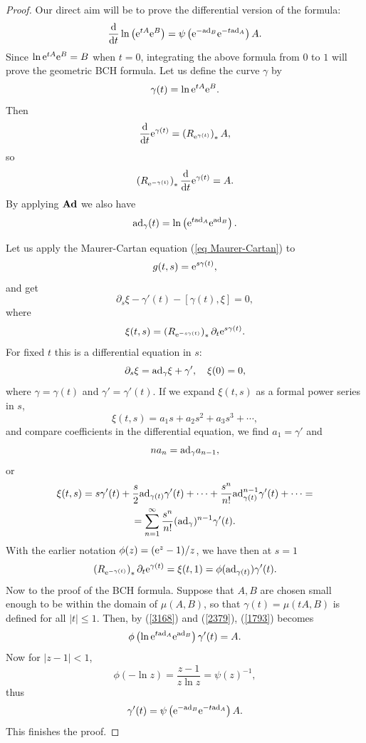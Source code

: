\begin{proof}
    Our direct aim will be to prove the differential version of the formula:
    \[\frac{{\mathrm{d}}}{{\mathrm{d}} t}\ln\left(\mathrm{e}^{tA} \mathrm{e}^B\right)=\psi\left(\mathrm{e}^{-\mathrm{ad}_B}\mathrm{e}^{-t\mathrm{ad}_A}\right)A.\]
    Since $\ln \mathrm{e}^{tA} \mathrm{e}^{B}=B$ when $t=0$, integrating the above formula from $0$ to $1$ will prove the geometric BCH formula. Let us define the curve $\gamma$ by
    \[\gamma(t)=\ln \mathrm{e}^{tA} \mathrm{e}^{B}.\]
    Then
    \[\frac{{\mathrm{d}}}{{\mathrm{d}} t} \mathrm{e}^{\gamma(t)}=\left(R_{\mathrm{e}^{\gamma(t)}}\right)_\ast A,\]
    so
    \[\left(R_{\mathrm{e}^{-\gamma(t)}}\right)_\ast\frac{{\mathrm{d}}}{{\mathrm{d}} t}\mathrm{e}^{\gamma(t)}=A.\label{2379}\]
    By applying $\mathrm{\mathbf{Ad}}$ we also have
    \[\mathrm{ad}_\gamma(t)=\ln\left(\mathrm{e}^{t\mathrm{ad}_A}\mathrm{e}^{\mathrm{ad}_{B}}\right).\label{3168}\]
    
    Let us apply the Maurer-Cartan equation (\ref{eq Maurer-Cartan}) to
    \[g(t,s)=\mathrm{e}^{s\gamma(t)},\]
    and get 
    \[\partial_s \xi-\gamma'(t)-[\gamma(t),\xi]=0,\]
    where 
    \[\xi(t,s)=\left(R_{\mathrm{e}^{-s\gamma(t)}}\right)_\ast\partial_t \mathrm{e}^{s\gamma(t)}.\]
    For fixed $t$ this is a differential equation in $s$:
    \[\partial_s\xi=\mathrm{ad}_\gamma\xi+\gamma',\quad \xi(0)=0,\]
    where $\gamma=\gamma(t)$ and $\gamma'=\gamma'(t)$. If we expand $\xi(t,s)$ as a formal power series in $s$,
    \[\xi(t,s)=a_1s+a_2s^2+a_3s^3+\cdots,\]
    and compare coefficients in the differential equation, we find $a_1=\gamma'$ and 
    \[na_n=\mathrm{ad}_\gamma a_{n-1},\]
    or 
    \begin{multline}
        \xi(t,s)=s\gamma'(t)+\frac{s}{2}\mathrm{ad}_{\gamma(t)}\gamma'(t)+\cdots+\frac{s^n}{n!}\mathrm{ad}_{\gamma(t)}^{n-1}\gamma'(t)+\cdots=\\=\sum_{n=1}^\infty \frac{s^n}{n!}(\mathrm{ad}_\gamma)^{n-1}\gamma'(t).
    \end{multline}
    With the earlier notation $\phi(z)=(\mathrm{e}^z-1)/z$, we have then at $s=1$
    \[\left(R_{\mathrm{e}^{-\gamma(t)}}\right)_\ast \partial_t \mathrm{e}^{\gamma(t)}=\xi(t,1)=\phi(\mathrm{ad}_{\gamma(t)})\gamma'(t).\label{1793}\]
    Now to the proof of the BCH formula. Suppose that $A,B$ are chosen small enough to be within the domain of $\mu(A,B)$, so that $\gamma(t)=\mu(tA,B)$ is defined for all $|t|\leq 1$. Then, by (\ref{3168}) and (\ref{2379}), (\ref{1793}) becomes
    \[\phi\left(\ln \mathrm{e}^{t\mathrm{ad}_A}\mathrm{e}^{\mathrm{ad}_B}\right)\gamma'(t)=A.\]
    Now for $|z-1|<1$,
    \[\phi(-\ln z)=\frac{z-1}{z\ln z}=\psi(z)^{-1},\]
    thus
    \[\gamma'(t)=\psi\left(\mathrm{e}^{-\mathrm{ad}_B}\mathrm{e}^{-t\mathrm{ad}_A}\right)A.\]
    This finishes the proof.
\end{proof}





